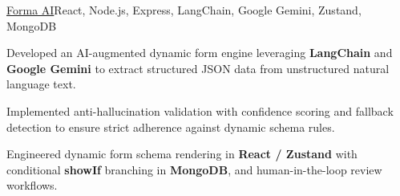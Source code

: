 \begin{cvproject}{\uline{Forma AI}}{React, Node.js, Express, LangChain, Google Gemini, Zustand, MongoDB}
    \item Developed an AI-augmented dynamic form engine leveraging \textbf{LangChain} and \textbf{Google Gemini} to extract structured JSON data from unstructured natural language text.
    \item Implemented anti-hallucination validation with confidence scoring and fallback detection to ensure strict adherence against dynamic schema rules.
    \item Engineered dynamic form schema rendering in \textbf{React / Zustand} with conditional \textbf{showIf} branching in \textbf{MongoDB}, and human-in-the-loop review workflows.
\end{cvproject}
